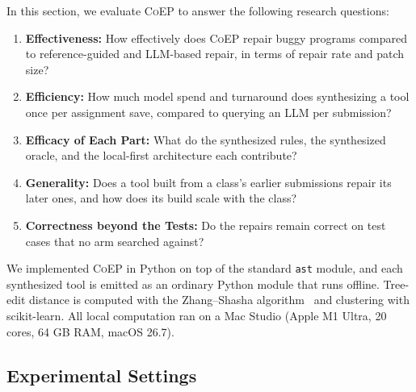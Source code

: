 \documentclass[acmsmall,screen,review,anonymous,nonacm]{acmart}
\newcommand{\tool}{\textsc{CoEP}\xspace}
\begin{document}
In this section, we evaluate \tool to answer the following research questions:
\begin{enumerate}
  \item[(1)] \textbf{Effectiveness:} How effectively does \tool repair buggy programs compared to reference-guided and LLM-based repair, in terms of repair rate and patch size?
  \item[(2)] \textbf{Efficiency:} How much model spend and turnaround does synthesizing a tool once per assignment save, compared to querying an LLM per submission?
  \item[(3)] \textbf{Efficacy of Each Part:} What do the synthesized rules, the synthesized oracle, and the local-first architecture each contribute?
  \item[(4)] \textbf{Generality:} Does a tool built from a class's earlier submissions repair its later ones, and how does its build scale with the class?
  \item[(5)] \textbf{Correctness beyond the Tests:} Do the repairs remain correct on test cases that no arm searched against?
\end{enumerate}
We implemented \tool in Python on top of the standard \texttt{ast} module, and each synthesized tool is emitted as an ordinary Python module that runs offline. Tree-edit distance is computed with the Zhang--Shasha algorithm~\cite{zhang1989simple} and clustering with scikit-learn. All local computation ran on a Mac Studio (Apple M1 Ultra, 20 cores, 64 GB RAM, macOS 26.7).

\subsection{Experimental Settings}
\label{sec:settings}
\end{document}
